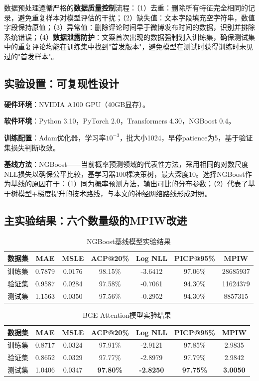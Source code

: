 \documentclass[10pt]{article}
\begin{document}
数据预处理遵循严格的\textbf{数据质量控制}流程：（1）去重：删除所有特征完全相同的记录，避免重复样本对模型评估的干扰；（2）缺失值：文本字段填充空字符串，数值字段保持原值；（3）异常值：删除评论时间早于微博发布时间的数据，识别并排除系统错误；（4）\textbf{数据泄露防护}：文案首次出现的数据强制划入训练集，确保测试集中的重复评论均能在训练集中找到"首发版本"，避免模型在测试时获得训练时未见过的"首发样本"。

\subsection{实验设置：可复现性设计}

\textbf{硬件环境}：NVIDIA A100 GPU（40GB显存）。

\textbf{软件环境}：Python 3.10，PyTorch 2.0，Transformers 4.30，NGBoost 0.4。

\textbf{训练配置}：Adam优化器，学习率$10^{-3}$，批大小1024，早停patience为5，基于验证集损失判断收敛。

\textbf{基线方法}：NGBoost\cite{duan2020ngboost}——当前概率预测领域的代表性方法，采用相同的对数尺度NLL损失以确保公平比较，基学习器100棵决策树，最大深度10。选择NGBoost作为基线的原因在于：（1）同为概率预测方法，输出可比的分布参数；（2）代表了基于树模型+梯度提升的技术路线，与本文的神经网络路线形成对照。

\subsection{主实验结果：六个数量级的MPIW改进}

\begin{table}[H]
\centering
\caption{NGBoost基线模型实验结果}
\label{tab:ngboost_results}
\begin{tabular}{lcccccc}
\toprule
\textbf{数据集} & \textbf{MAE} & \textbf{MSLE} & \textbf{ACP@20\%} & \textbf{Log NLL} & \textbf{PICP@95\%} & \textbf{MPIW} \\
\midrule
训练集 & 0.7879 & 0.0176 & 98.15\% & -3.6412 & 97.06\% & 28685937 \\
验证集 & 0.9587 & 0.0284 & 97.58\% & -0.7061 & 94.30\% & 11624379 \\
测试集 & 1.1563 & 0.0350 & 97.56\% & -0.2952 & 94.30\% & 8857315 \\
\bottomrule
\end{tabular}
\end{table}

\begin{table}[H]
\centering
\caption{BGE-Attention模型实验结果}
\label{tab:bge_results}
\begin{tabular}{lcccccc}
\toprule
\textbf{数据集} & \textbf{MAE} & \textbf{MSLE} & \textbf{ACP@20\%} & \textbf{Log NLL} & \textbf{PICP@95\%} & \textbf{MPIW} \\
\midrule
训练集 & 0.8717 & 0.0324 & 97.91\% & -2.9121 & 97.85\% & 2.9835 \\
验证集 & 0.8652 & 0.0329 & 97.77\% & -2.8979 & 97.79\% & 2.9842 \\
测试集 & 1.0406 & 0.0347 & \textbf{97.80\%} & \textbf{-2.8250} & \textbf{97.75\%} & \textbf{3.0050} \\
\bottomrule
\end{tabular}
\end{table}
\end{document}
